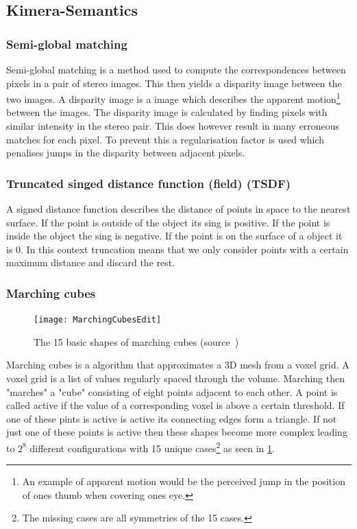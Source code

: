\documentclass[11pt,a4paper]{article}
\begin{document}
\subsection{Kimera-Semantics}
\subsubsection{Semi-global matching} \label{pre:semi-global matching}
Semi-global matching is a method used  to compute the correspondences between pixels in a pair of stereo images. 
This then yields a disparity image between the two images. 
A disparity image is a image which describes the apparent motion\footnote{An example of apparent motion would be the perceived jump in the position of ones thumb when covering ones eye.} between the images.
The disparity image is calculated by finding pixels with similar intensity in the stereo pair. 
This does however result in many erroneous matches for each pixel. 
To prevent this a regularisation factor is used which penalises jumps in the disparity between adjacent pixels.
\subsubsection{Truncated singed distance function (field) (TSDF)} \label{pre:TSDF}
A signed distance function describes the distance of points in space to the nearest surface.
If the point is outside of the object its sing is positive.
If the point is inside the object the sing is negative. 
If the point is on the surface of a object it is 0. 
In this context truncation means that we only consider points with a certain maximum distance and discard the rest. 
\subsubsection{Marching cubes} \label{pre:marching cubes} 
\begin{figure}
  \centering
  \texttt{[image: MarchingCubesEdit]}
  \caption{The 15 basic shapes of marching cubes (source~\cite{marchingCubesImage})}\label{Fig:Marching cubes}  
\end{figure}
Marching cubes is a algorithm that approximates a 3D mesh from a voxel grid. 
A voxel grid is a list of values regularly spaced through the volume. 
Marching then "marches" a "cube" consisting of eight  points adjacent to each other.
A point is called active if the value of a corresponding voxel is above a certain threshold.
If one of these pints is active is active its connecting edges form a triangle. 
If not just one of these points is active then these shapes become more complex leading to $2^8$ different configurations with 15 unique cases\footnote{The missing cases are all symmetries of the 15 cases.} as seen in \ref{Fig:Marching cubes}.
\end{document}

